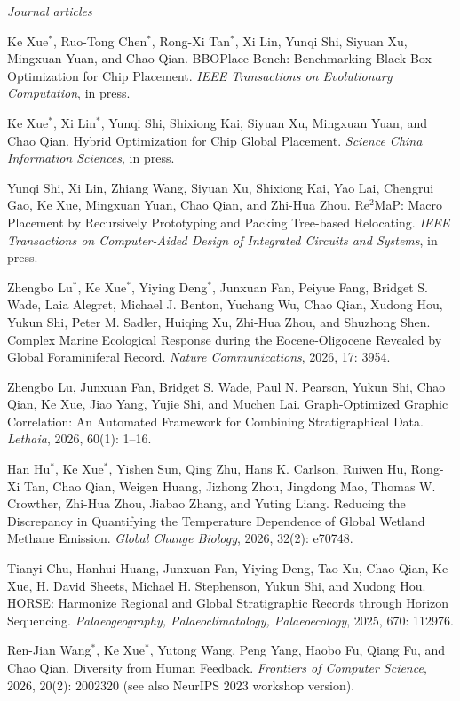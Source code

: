 \documentclass[10pt,a4paper]{article}
\begin{document}
\textit{Journal articles}
\begin{cvbullet}
  \item Ke Xue$^*$, Ruo-Tong Chen$^*$, Rong-Xi Tan$^*$, Xi Lin, Yunqi Shi, Siyuan Xu, Mingxuan Yuan, and Chao Qian. BBOPlace-Bench: Benchmarking Black-Box Optimization for Chip Placement. \textit{IEEE Transactions on Evolutionary Computation}, in press.
  \item Ke Xue$^*$, Xi Lin$^*$, Yunqi Shi, Shixiong Kai, Siyuan Xu, Mingxuan Yuan, and Chao Qian. Hybrid Optimization for Chip Global Placement. \textit{Science China Information Sciences}, in press.
  \item Yunqi Shi, Xi Lin, Zhiang Wang, Siyuan Xu, Shixiong Kai, Yao Lai, Chengrui Gao, Ke Xue, Mingxuan Yuan, Chao Qian, and Zhi-Hua Zhou. Re$^2$MaP: Macro Placement by Recursively Prototyping and Packing Tree-based Relocating. \textit{IEEE Transactions on Computer-Aided Design of Integrated Circuits and Systems}, in press.
  \item Zhengbo Lu$^*$, Ke Xue$^*$, Yiying Deng$^*$, Junxuan Fan, Peiyue Fang, Bridget S. Wade, Laia Alegret, Michael J. Benton, Yuchang Wu, Chao Qian, Xudong Hou, Yukun Shi, Peter M. Sadler, Huiqing Xu, Zhi-Hua Zhou, and Shuzhong Shen. Complex Marine Ecological Response during the Eocene-Oligocene Revealed by Global Foraminiferal Record. \textit{Nature Communications}, 2026, 17: 3954.
  \item Zhengbo Lu, Junxuan Fan, Bridget S. Wade, Paul N. Pearson, Yukun Shi, Chao Qian, Ke Xue, Jiao Yang, Yujie Shi, and Muchen Lai. Graph-Optimized Graphic Correlation: An Automated Framework for Combining Stratigraphical Data. \textit{Lethaia}, 2026, 60(1): 1--16.
  \item Han Hu$^*$, Ke Xue$^*$, Yishen Sun, Qing Zhu, Hans K. Carlson, Ruiwen Hu, Rong-Xi Tan, Chao Qian, Weigen Huang, Jizhong Zhou, Jingdong Mao, Thomas W. Crowther, Zhi-Hua Zhou, Jiabao Zhang, and Yuting Liang. Reducing the Discrepancy in Quantifying the Temperature Dependence of Global Wetland Methane Emission. \textit{Global Change Biology}, 2026, 32(2): e70748.
  \item Tianyi Chu, Hanhui Huang, Junxuan Fan, Yiying Deng, Tao Xu, Chao Qian, Ke Xue, H. David Sheets, Michael H. Stephenson, Yukun Shi, and Xudong Hou. HORSE: Harmonize Regional and Global Stratigraphic Records through Horizon Sequencing. \textit{Palaeogeography, Palaeoclimatology, Palaeoecology}, 2025, 670: 112976.
  \item Ren-Jian Wang$^*$, Ke Xue$^*$, Yutong Wang, Peng Yang, Haobo Fu, Qiang Fu, and Chao Qian. Diversity from Human Feedback. \textit{Frontiers of Computer Science}, 2026, 20(2): 2002320 (see also NeurIPS 2023 workshop version).

\end{cvbullet}
\end{document}
